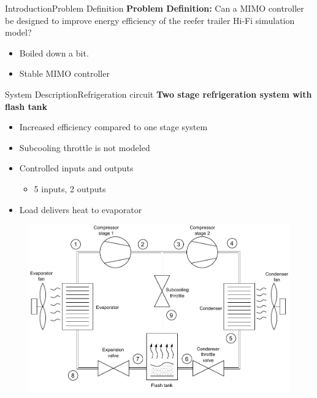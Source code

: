 \begin{frame}{Introduction}{Problem Definition}
	\textbf{Problem Definition:} Can a MIMO controller be designed to improve energy efficiency of the reefer trailer Hi-Fi simulation model?
	\begin{itemize}
		\item Boiled down a bit. 
		\item Stable MIMO controller
	\end{itemize}
\end{frame}

\begin{frame}{System Description}{Refrigeration circuit}
	\textbf{Two stage refrigeration system with flash tank}
	\begin{itemize}
		\item Increased efficiency compared to one stage system 
		\item Subcooling throttle is not modeled
		\item Controlled inputs and outputs
		\begin{itemize}
			\item 5 inputs, 2 outputs
		\end{itemize}
		\item Load delivers heat to evaporator
	\end{itemize}
\begin{figure}[h]
	\centering
	\begin{minipage}{0.6\textwidth}
		\centering
		\includegraphics[width=1\textwidth]{../Graphics/HVAC_Diagram_Fans.pdf} %
	\end{minipage}\hfill

\end{figure}
\end{frame}
